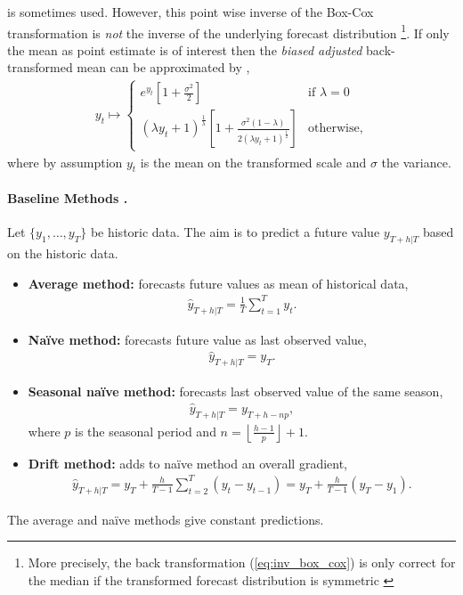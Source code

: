 \documentclass[12pt,a4paper]{article}
\begin{document}
\begin{itemize}
	is sometimes used. However, this point wise inverse of the Box-Cox transformation is \textit{not} the inverse of the underlying forecast distribution \footnote{More precisely, the back transformation (\ref{eq:inv_box_cox}) is only  correct for the median if the transformed forecast distribution is symmetric \cite{hyndman_forecasting_principles_2018}}. If only the mean as point estimate is of interest then the \textit{biased adjusted} back-transformed mean can be approximated by \cite{hyndman_blog_back_transform}, 
	\begin{align} \label{eq:inv_box_cox}
	y_t \mapsto 
	\begin{cases}
	e^{y_t}\left[1+\frac{\sigma^2}{2}\right] & \text{if } \lambda = 0\\ 
	(\lambda y_t + 1)^ \frac{1}{\lambda} \left[1+\frac{\sigma^2(1-\lambda)}{2(\lambda y_t + 1)^ \frac{1}{2} }\right] & \text{otherwise,}
	\end{cases}	
	\end{align}
	where by assumption $y_t$ is the mean on the transformed scale and  $\sigma$ the variance.
	  
\end{itemize}

\paragraph{Baseline Methods \cite{hyndman_forecasting_principles_2018}.}
Let $\{y_1, \dots, y_T\}$ be historic data. The aim is to predict a future value $y_{T+h | T}$ based on the historic data.
\begin{itemize}
	\item \textbf{Average method:} forecasts future values as mean of historical data, 
	\begin{align}
		\hat y_{T+h | T} = \frac{1}{T}\sum_{t=1} ^T y_t.
	\end{align}
	\item \textbf{Na\"ive method:} forecasts future value as last observed value, 
	\begin{align}
		\hat y_{T+h | T} = y_T.
	\end{align}
	\item \textbf{Seasonal na\"ive method:} forecasts last observed value of the same season, 
	\begin{align}
		\hat y_{T+h | T} =y_{T+h-np},
	\end{align}
	 where $p$ is the seasonal period and  $n = \left \lfloor{\frac{h-1}{p}}\right \rfloor + 1$. 
	\item \textbf{Drift method:} adds to na\"ive method an overall gradient,   
	\begin{align}
		\hat y_{T+h | T} = y_{T} +  \frac{h}{T-1} \sum_{t=2}^{T} \left(y_t - y_{t-1}\right) = y_{T} +  \frac{h}{T-1}  \left(y_T - y_1\right).
	\end{align}
\end{itemize}
The average and na\"ive methods give constant predictions.
\end{document}
